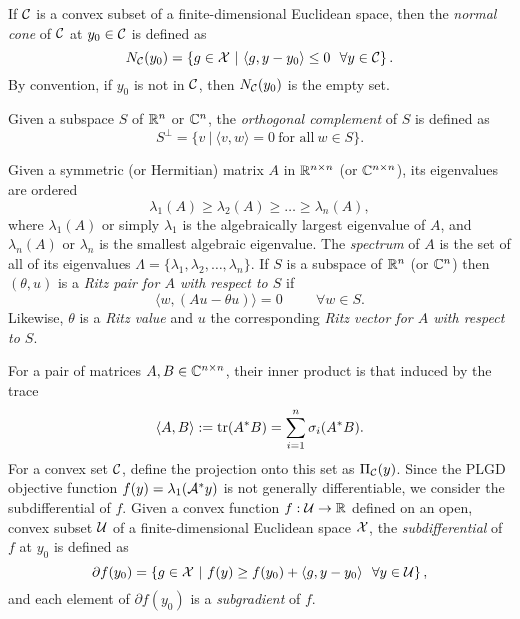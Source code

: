 If ${\mathcal C}$ is a convex subset of a finite-dimensional Euclidean space, then the \textit{normal cone} of ${\mathcal C}$ at $y_0 \in {\mathcal C}$ is defined as
\begin{equation} 			\label{Def:normal_cone}
N_{\mathcal C}(y_0) = \left\{ g \in {\mathcal X} \ | \ \langle g, y - y_0 \rangle \leq 0 \ \ \forall y \in {\mathcal C} \right\}.
\end{equation}
By convention, if $y_0$ is not in ${\mathcal C}$, then $N_{\mathcal C}(y_0)$ is the empty set.

Given a subspace $S$ of ${\mathbb R}^n$ or ${\mathbb C}^n$, the \textit{orthogonal complement} of $S$ is defined as
\begin{equation}
S^\perp = \{ v \ | \ \langle v, w \rangle = 0 \ \text{for all} \ w \in S \}.
\end{equation}


Given a symmetric (or Hermitian) matrix $A$ in ${\mathbb R}^{n \times n}$ (or ${\mathbb C}^{n \times n}$), its eigenvalues are ordered
\begin{equation}			\label{Def:eigenvalues}
\lambda_1(A) \geq \lambda_2(A) \geq \ldots \geq \lambda_n(A),
\end{equation}
where $\lambda_1(A)$ or simply $\lambda_1$ is the algebraically largest eigenvalue of $A$, and $\lambda_n(A)$ or $\lambda_n$ is the smallest algebraic eigenvalue.  The \textit{spectrum} of $A$ is the set of all of its eigenvalues $\Lambda = \{ \lambda_1, \lambda_2, \ldots, \lambda_n\}$.
If $S$ is a subspace of ${\mathbb R}^n$ (or ${\mathbb C}^n$) then $(\theta, u)$ is a \textit{Ritz pair for $A$ with respect to $S$} if 
\begin{equation} 			\label{Def:Ritz_pair_val_vec}
\langle w, (Au-\theta u) \rangle = 0 \hspace{1cm} \forall w \in S.
\end{equation}
Likewise, $\theta$ is a \textit{Ritz value} and $u$ the corresponding \textit{Ritz vector for $A$ with respect to $S$}.

For a pair of matrices $A, B \in {\mathbb C}^{n \times n}$, their inner product is that induced by the trace
\begin{equation}			\label{Def:trace_inner_product}
\langle A, B \rangle := \mathrm{tr}(A^*B) = \sum_{i=1}^n \sigma_i(A^*B).
\end{equation}
For a convex set ${\mathcal C}$, define the projection onto this set as $\Pi_{\mathcal C}(y)$.  Since the PLGD objective function $f(y) = \lambda_1({\mathcal A}^*y)$ is not generally differentiable, we consider the subdifferential of $f$.  Given a convex function $f : {\mathcal U} \rightarrow {\mathbb R}$ defined on an open, convex subset ${\mathcal U}$ of a finite-dimensional Euclidean space ${\mathcal X}$, the \textit{subdifferential} of $f$ at $y_0$ is defined as
\begin{equation}
	\label{Def:subdifferential}
	\partial f(y_0) = \left\{  g \in {\mathcal X} \ | \ f(y) \geq f(y_0) + \langle g, y - y_0 \rangle \ \ \forall y \in {\mathcal U}	\right\},
\end{equation}
and each element of $\partial f(y_0)$ is a \textit{subgradient} of $f$.


